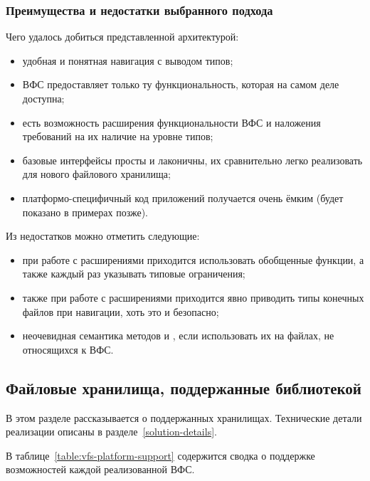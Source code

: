   \subsubsection{Преимущества и недостатки выбранного подхода}
    Чего удалось добиться представленной архитектурой:
    \begin{itemize}
      \item удобная и понятная навигация с выводом типов;
      \item ВФС предоставляет только ту функциональность, которая на самом деле доступна;
      \item есть возможность расширения функциональности ВФС и наложения требований на их наличие на уровне типов;
      \item базовые интерфейсы просты и лаконичны, их сравнительно легко реализовать для нового файлового хранилища;
      \item платформо-специфичный код приложений получается очень ёмким (будет показано в примерах позже).
    \end{itemize}
    Из недостатков можно отметить следующие:
    \begin{itemize}
      \item при работе с расширениями приходится использовать обобщенные функции, а также каждый раз указывать типовые ограничения;
      \item также при работе с расширениями приходится явно приводить типы конечных файлов при навигации, хоть это и безопасно;
      \item неочевидная семантика методов  и , если использовать их на файлах, не относящихся к ВФС.
    \end{itemize}


\subsection{Файловые хранилища, поддержанные библиотекой}
  В этом разделе рассказывается о поддержанных хранилищах. Технические детали реализации описаны в разделе~\ref{solution-details}.
  
  В таблице~\ref{table:vfs-platform-support} содержится сводка о поддержке возможностей каждой реализованной ВФС.

